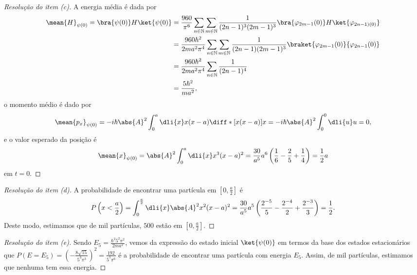 \begin{proof}[Resolução do item (c)]
    A energia média é dada por
    \begin{align*}
        \mean{H}_{\psi(0)} = \bra{\psi(0)}H\ket{\psi(0)} &= \frac{960}{\pi^6} \sum_{n \in \mathbb{N}} \sum_{m \in \mathbb{N}} \frac{1}{(2n - 1)^3(2m - 1)^3} \bra{\varphi_{2m - 1}(0)} H \ket{\varphi_{2n - 1)(0)}}\\
                                                         &= \frac{960 \hbar^2}{2ma^2\pi^4} \sum_{n \in \mathbb{N}}\sum_{m \in \mathbb{N}} \frac{1}{(2n - 1)(2m - 1)^3} \braket{\varphi_{2m - 1}(0)}{\varphi_{2n-1}(0)}\\
                                                         &= \frac{960\hbar^2}{2ma^2 \pi^4} \sum_{n \in \mathbb{N}} \frac{1}{(2n - 1)^4}\\
                                                         &= \frac{5\hbar^2}{ma^2},
    \end{align*}
    o momento médio é dado por
    \begin{equation*}
        \mean{p_x}_{\psi(0)} = -i \hbar\abs{A}^2\int_0^a \dli{x} x(x - a) \diff*{[x(x-a)]}{x} = -i\hbar \abs{A}^2 \int_0^0\dli{u} u = 0,
    \end{equation*}
    e o valor esperado da posição é
    \begin{equation*}
        \mean{x}_{\psi(0)} = \abs{A}^2\int_0^a \dli{x} x^3(x-a)^2 = \frac{30}{a^5}a^6 \left(\frac16 - \frac25 + \frac14\right) = \frac12a
    \end{equation*}
    em \(t = 0\).
\end{proof}
\begin{proof}[Resolução do item (d)]
    A probabilidade de encontrar uma partícula em \([0,\frac{a}2]\) é
    \begin{equation*}
        P\left(x < \frac{a}{2}\right) = \int_{0}^{\frac{a}2}\dli{x} \abs{A}^2 x^2(x - a)^2 = \frac{30}{a^5} a^5 \left(\frac{2^{-5}}{5} - \frac{2^{-4}}{2} + \frac{2^{-3}}{3}\right) = \frac12.
    \end{equation*}
    Deste modo, estimamos que de mil partículas, \(500\) estão em \([0,\frac{a}{2}]\).
\end{proof}
\begin{proof}[Resolução do item (e)]
    Sendo \(E_5 = \frac{\hbar^2 5^2 \pi^2}{2ma^2}\), vemos da expressão do estado inicial \(\ket{\psi(0)}\) em termos da base dos estados estacionários que \(P(E = E_5) = \left(-\frac{8\sqrt{15}}{5^3 \pi^3}\right)^2 =\frac{192}{5^5\pi^6}\) é a probabilidade de encontrar uma partícula com energia \(E_5\). Assim, de mil partículas, estimamos que nenhuma tem essa energia.
\end{proof}
